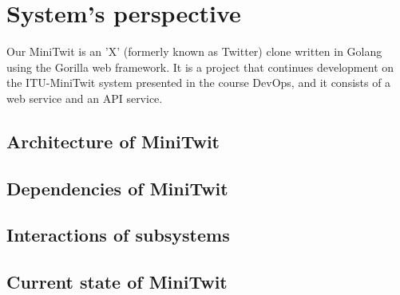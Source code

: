 \section{System's perspective}
Our MiniTwit is an 'X' (formerly known as Twitter) clone written in Golang using the Gorilla web framework. It is a project that continues development on the ITU-MiniTwit system presented in the course DevOps, and it consists of a web service and an API service. 

\subsection{Architecture of MiniTwit}


\subsection{Dependencies of MiniTwit}


\subsection{Interactions of subsystems}


\subsection{Current state of MiniTwit}
